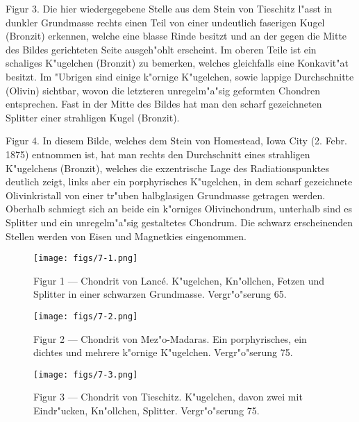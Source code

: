 \documentclass[a4paper, 11pt, oneside, polutonikogreek, german]{article}
\begin{document}
Figur 3. Die hier wiedergegebene Stelle aus dem Stein von Tieschitz l"asst in dunkler Grundmasse rechts einen Teil von einer undeutlich faserigen Kugel (Bronzit) erkennen, welche eine blasse Rinde besitzt und an der gegen die Mitte des Bildes gerichteten Seite ausgeh"ohlt erscheint. Im oberen Teile ist ein schaliges K"ugelchen (Bronzit) zu bemerken, welches gleichfalls eine Konkavit"at besitzt. Im "Ubrigen sind einige k"ornige K"ugelchen, sowie lappige Durchschnitte (Olivin) sichtbar, wovon die letzteren unregelm"a"sig geformten Chondren entsprechen. Fast in der Mitte des Bildes hat man den scharf gezeichneten Splitter einer strahligen Kugel (Bronzit).

Figur 4. In diesem Bilde, welches dem Stein von Homestead, Iowa City (2. Febr. 1875) entnommen ist, hat man rechts den Durchschnitt eines strahligen K"ugelchens (Bronzit), welches die exzentrische Lage des Radiationspunktes deutlich zeigt, links aber ein porphyrisches K"ugelchen, in dem scharf gezeichnete Olivinkristall von einer tr"uben halbglasigen Grundmasse getragen werden. Oberhalb schmiegt sich an beide ein k"orniges Olivinchondrum, unterhalb sind es Splitter und ein unregelm"a"sig gestaltetes Chondrum. Die schwarz erscheinenden Stellen werden von Eisen und Magnetkies eingenommen.
\clearpage

\vspace*{\fill}
\begin{figure}[H]
\centering
\texttt{[image: figs/7-1.png]}
\caption{\small Figur 1 --- Chondrit von Lancé. K"ugelchen, Kn"ollchen, Fetzen und Splitter in einer schwarzen Grundmasse. Vergr"o"serung 65.}
\end{figure}
\vspace*{\fill}
\clearpage

\vspace*{\fill}
\begin{figure}[H]
\centering
\texttt{[image: figs/7-2.png]}
\caption{\small Figur 2 --- Chondrit von Mez"o-Madaras. Ein porphyrisches, ein dichtes und mehrere k"ornige K"ugelchen. Vergr"o"serung 75.}
\end{figure}
\vspace*{\fill}
\clearpage

\vspace*{\fill}
\begin{figure}[H]
\centering
\texttt{[image: figs/7-3.png]}
\caption{\small Figur 3 --- Chondrit von Tieschitz. K"ugelchen, davon zwei mit Eindr"ucken, Kn"ollchen, Splitter. Vergr"o"serung 75.}
\end{figure}
\vspace*{\fill}
\clearpage
\end{document}
